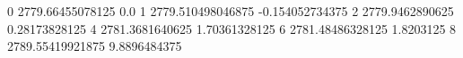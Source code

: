 0 2779.66455078125 0.0
1 2779.510498046875 -0.154052734375
2 2779.9462890625 0.28173828125
4 2781.3681640625 1.70361328125
6 2781.48486328125 1.8203125
8 2789.55419921875 9.8896484375
